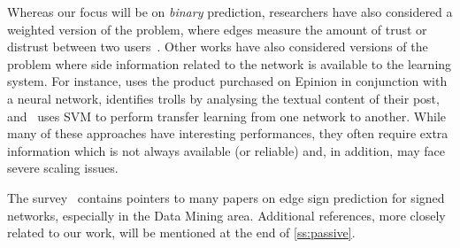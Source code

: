 Whereas our focus will be on \emph{binary} prediction, researchers have also considered a weighted
version of the problem, where edges measure the amount of trust or distrust between two
users~\autocites{guha2004propagation}{Tang2013}{Bachi2012}{Qian2014sn}. Other works have also
considered versions of the problem where side information related to the network is available to
the learning system. For instance, \autocite{EdgeSignsRating15} uses the product purchased on
Epinion in conjunction with a neural network, \autocite{TrollDetection15} identifies trolls by
analysing the textual content of their post, and~\autocite{SNTransfer13} uses SVM to perform
transfer learning from one network to another. While many of these approaches have interesting
performances, they often require extra information which is not always available (or reliable) and,
in addition, may face severe scaling issues.

The survey~\autocite{Tang2015a} contains pointers to many papers on edge sign prediction for
signed networks, especially in the Data Mining area. Additional references, more closely related to
our work, will be mentioned at the end of \autoref{ss:passive}.
